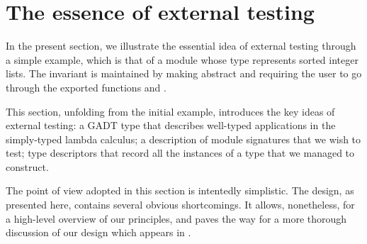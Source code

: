\section{The essence of external testing}
\label{sec:essence}

In the present section, we illustrate the essential idea of external testing
through a simple example, which is that of a module  whose type
 represents sorted integer lists. The invariant is maintained by making
 abstract and requiring the user to go through the exported functions
 and .

This section, unfolding from the initial example, introduces the key ideas of
external testing: a GADT type that describes well-typed applications in the
simply-typed lambda calculus; a description of module signatures that we wish to
test; type descriptors that record all the instances of a type that we managed
to construct.

The point of view adopted in this section is intentedly simplistic. The design,
as presented here, contains several obvious shortcomings. It allows,
nonetheless, for a high-level overview of our principles, and paves the way for
a more thorough discussion of our design which appears in
.

